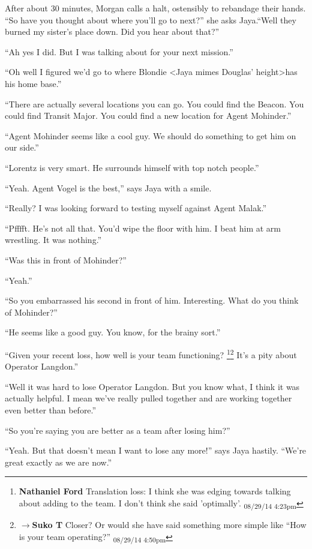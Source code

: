 After about 30 minutes, Morgan calls a halt, ostensibly to rebandage their hands.  ``So have you thought about where you'll go to next?'' she asks Jaya.``Well they burned my sister's place down.  Did you hear about that?''

``Ah yes I did.  But I was talking about for your next mission.''

``Oh well I figured we'd go to where Blondie \textless Jaya mimes Douglas' height\textgreater  has his home base.''

``There are actually several locations you can go.  You could find the Beacon.  You could find Transit Major.  You could find a new location for Agent Mohinder.''

``Agent Mohinder seems like a cool guy.  We should do something to get him on our side.''

``Lorentz is very smart.  He surrounds himself with top notch people.''

``Yeah.  Agent Vogel is the best,'' says Jaya with a smile.

``Really?  I was looking forward to testing myself against Agent Malak.''

``Pfffft.  He's not all that.  You'd wipe the floor with him.  I beat him at arm wrestling.  It was nothing.''

``Was this in front of Mohinder?''

``Yeah.''

``So you embarrassed his second in front of him.  Interesting.  What do you think of Mohinder?''

``He seems like a good guy.  You know, for the brainy sort.''

``Given your recent loss, how well is your team functioning? \footnote{\textbf{Nathaniel Ford }Translation loss: I think she was edging towards talking about adding to the team. I don't think she said 'optimally'. \textsubscript{08/29/14 4:23pm}}\footnote{$\rightarrow$\textbf{Suko T }Closer?  Or would she have said something more simple like ``How is your team operating?'' \textsubscript{08/29/14 4:50pm}}   It's a pity about Operator Langdon.''

``Well it was hard to lose Operator Langdon.  But you know what, I think it was actually helpful.  I mean we've really pulled together and are working together even better than before.''

``So you're saying you are better as a team after losing him?''

``Yeah.  But that doesn't mean I want to lose any more!'' says Jaya hastily.  ``We're great exactly as we are now.''

